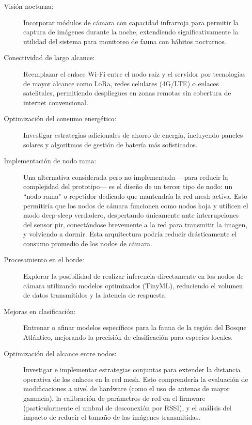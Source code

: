 \documentclass[a4paper, 12pt]{report}
\begin{document}
\begin{description}
  \item[Visión nocturna:] Incorporar módulos de cámara con capacidad
    infrarroja para permitir la captura de imágenes durante la noche,
    extendiendo significativamente la utilidad del sistema para
    monitoreo de fauna con hábitos nocturnos.

  \item[Conectividad de largo alcance:] Reemplazar el enlace Wi-Fi entre
    el nodo raíz y el servidor por tecnologías de mayor alcance como
    LoRa, redes celulares (4G/LTE) o enlaces satelitales, permitiendo
    despliegues en zonas remotas sin cobertura de internet convencional.

  \item[Optimización del consumo energético:] Investigar estrategias
    adicionales de ahorro de energía, incluyendo paneles solares y
    algoritmos de gestión de batería más sofisticados.

  \item[Implementación de nodo rama:] Una alternativa considerada pero no
    implementada ---para reducir la complejidad del prototipo--- es el
    diseño de un tercer tipo de nodo: un ``nodo rama'' o repetidor
    dedicado que mantendría la red mesh activa. Esto permitiría que
    los nodos de cámara funcionen como nodos hoja y utilicen el modo
    \gls{deep-sleep} verdadero, despertando únicamente ante
    interrupciones del sensor \gls{pir}, conectándose brevemente a la
    red para transmitir la imagen, y volviendo a dormir. Esta
    arquitectura podría reducir drásticamente el consumo promedio de
    los nodos de cámara.

  \item[Procesamiento en el borde:] Explorar la posibilidad de realizar
    inferencia directamente en los nodos de cámara utilizando modelos
    optimizados (TinyML), reduciendo el volumen de datos transmitidos
    y la latencia de respuesta.

  \item[Mejoras en clasificación:] Entrenar o afinar modelos específicos
    para la fauna de la región del Bosque Atlántico, mejorando la
    precisión de clasificación para especies locales.

  \item[Optimización del alcance entre nodos:] Investigar e implementar
    estrategias conjuntas para extender la distancia operativa de los enlaces
    en la red \gls{mesh}. Esto comprendería la evaluación de modificaciones a
    nivel de hardware (como el uso de antenas de mayor ganancia), la
    calibración de parámetros de red en el firmware (particularmente el
    umbral de desconexión por RSSI), y el análisis del impacto de
    reducir el tamaño de las imágenes transmitidas.


\end{description}
\end{document}
